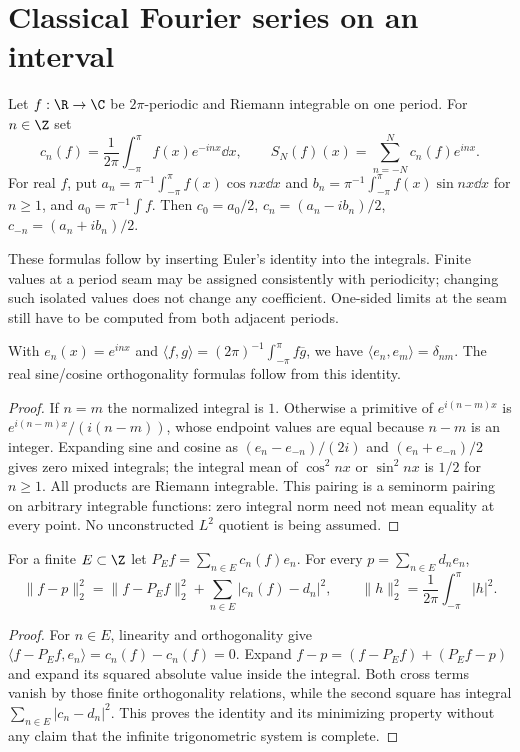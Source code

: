 \chapter{Classical Fourier series on an interval}
\label{module:M03.19}

\begin{definition}
Let $f:\R\to\C$ be $2\pi$-periodic and Riemann integrable on one period.
For $n\in\Z$ set
\[
 c_n(f)=\frac1{2\pi}\int_{-\pi}^{\pi}f(x)e^{-inx}\dd x,
 \qquad S_N(f)(x)=\sum_{n=-N}^Nc_n(f)e^{inx}.
\]
For real $f$, put
$a_n=\pi^{-1}\int_{-\pi}^{\pi}f(x)\cos nx\dd x$ and
$b_n=\pi^{-1}\int_{-\pi}^{\pi}f(x)\sin nx\dd x$ for $n\geq1$,
and $a_0=\pi^{-1}\int f$. Then
$c_0=a_0/2$, $c_n=(a_n-ib_n)/2$, $c_{-n}=(a_n+ib_n)/2$.
\end{definition}
These formulas follow by inserting Euler's identity into the integrals.
Finite values at a period seam may be assigned consistently with periodicity;
changing such isolated values does not change any coefficient. One-sided
limits at the seam still have to be computed from both adjacent periods.

\begin{proposition}
With $e_n(x)=e^{inx}$ and
$\langle f,g\rangle=(2\pi)^{-1}\int_{-\pi}^{\pi}f\overline g$,
we have $\langle e_n,e_m\rangle=\delta_{nm}$.
The real sine/cosine orthogonality formulas follow from this identity.
\end{proposition}
\begin{proof}
If $n=m$ the normalized integral is $1$. Otherwise a primitive of
$e^{i(n-m)x}$ is $e^{i(n-m)x}/(i(n-m))$, whose endpoint values are equal
because $n-m$ is an integer. Expanding sine and cosine as
$(e_n-e_{-n})/(2i)$ and $(e_n+e_{-n})/2$ gives zero mixed integrals;
the integral mean of $\cos^2 nx$ or $\sin^2 nx$ is $1/2$ for $n\geq1$.
All products are Riemann integrable. This pairing is a seminorm pairing
on arbitrary integrable functions: zero integral norm need not mean equality
at every point. No unconstructed $L^2$ quotient is being assumed.
\end{proof}

\begin{theorem}
For a finite $E\subset\Z$ let $P_Ef=\sum_{n\in E}c_n(f)e_n$. For every
$p=\sum_{n\in E}d_ne_n$,
\[
 \|f-p\|_2^2=\|f-P_Ef\|_2^2+\sum_{n\in E}|c_n(f)-d_n|^2,
 \qquad \|h\|_2^2=\frac1{2\pi}\int_{-\pi}^{\pi}|h|^2.
\]
\end{theorem}
\begin{proof}
For $n\in E$, linearity and orthogonality give
$\langle f-P_Ef,e_n\rangle=c_n(f)-c_n(f)=0$.
Expand $f-p=(f-P_Ef)+(P_Ef-p)$ and expand its squared absolute value
inside the integral. Both cross terms vanish by those finite orthogonality
relations, while the second square has integral
$\sum_{n\in E}|c_n-d_n|^2$. This proves the identity and its minimizing
property without any claim that the infinite trigonometric system is complete.
\end{proof}

